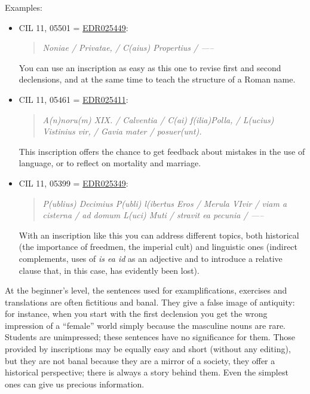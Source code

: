 \documentclass[amsthm,ebook]{saparticle}
\begin{document}
Examples:

\begin{itemize}
\item CIL 11, 05501 = \href{http://www.edr-edr.it/edr\_programmi/res\_complex\_comune.php?do=book\&id\_nr=EDR025449}{EDR025449}: \begin{quotation}
\emph{Noniae / Privatae, / C(aius) Propertius / -----}
\end{quotation}

You can use an inscription as easy as this one to revise first and second declensions, and at the same time to teach the
structure of a Roman name.

\item CIL 11, 05461 = \href{http://www.edr-edr.it/edr\_programmi/res\_complex\_comune.php?do=book\&id\_nr=EDR025411}{EDR025411}: \begin{quotation}
\emph{A(n)noru(m) XIX. / Calventia / C(ai) f(ilia)Polla, / L(ucius) Vistinius vir, / Gavia mater / posuer(unt).}

\end{quotation}
This inscription offers the chance to get feedback about mistakes in the use of language, or to reflect on mortality and
marriage.

\item CIL 11, 05399 = \href{http://www.edr-edr.it/edr\_programmi/res\_complex\_comune.php?do=book\&id\_nr=EDR025349}{EDR025349}: \begin{quotation}
\emph{P(ublius) Decimius P(ubli) l(ibertus Eros /  Merula VIvir / viam a cisterna / ad domum L(uci) Muti / stravit ea pecunia / -----}
\end{quotation}

With an inscription like this you can address different topics, both historical (the importance of freedmen, the
imperial cult) and linguistic ones (indirect complements, uses of \emph{is ea id} as an adjective and to introduce a relative
clause that, in this case, has evidently been lost).
\end{itemize}





At the beginner’s level, the sentences used for examplifications, exercises and translations are often fictitious and banal.
They give a false image of antiquity: for instance, when you start with the first declension you get the wrong
impression of a ``female'' world simply because the masculine nouns are rare. Students are unimpressed; these sentences have
no significance for them. Those provided by inscriptions may be equally easy and short (without any editing), but they are not banal because
they are a mirror of a society, they offer a historical perspective; there is always a story behind them. Even the
simplest ones can give us precious information.
\end{document}
